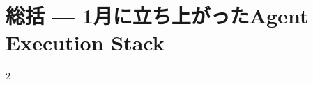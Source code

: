\documentclass[lualatex,a4paper,11pt]{jlreq}
\begin{document}
\clearpage
\section{総括 — 1月に立ち上がったAgent Execution Stack}
\label{pkg:closing-synthesis}

\medskip
\begin{multicols}{2}

\end{multicols}


\clearpage
\printbibliography[title={References / Source Notes}]
\end{document}
